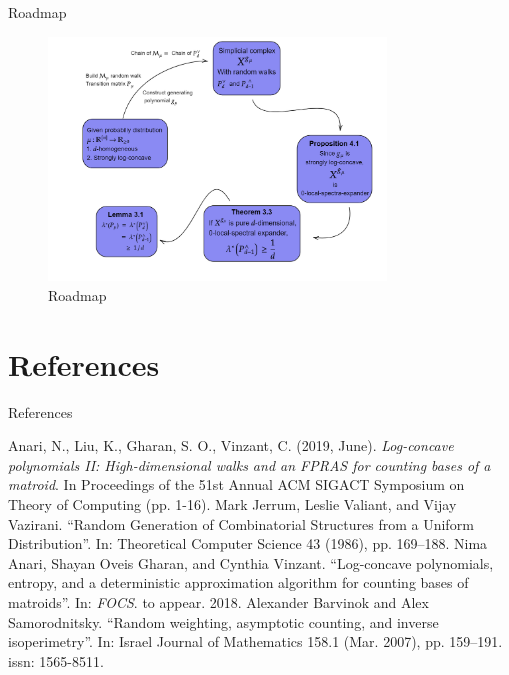 \documentclass[10pt]{beamer}
\begin{document}
\begin{frame}{Roadmap}
    \begin{figure}[H]
        \centering
        \includegraphics[width  = 0.8\textwidth]{imgs/diagram-20231214 (1).png}
        \caption{Roadmap}
        \label{fig:enter-label}
    \end{figure}
\end{frame}


\section[References]{References}
\begin{frame}{References}
\footnotesize\begin{thebibliography}{9}
    Anari, N., Liu, K., Gharan, S. O., Vinzant, C. (2019, June). \emph{Log-concave polynomials II: High-dimensional walks and an FPRAS for counting bases of a matroid}. In Proceedings of the  51st Annual ACM SIGACT Symposium on Theory of Computing (pp. 1-16).
    Mark Jerrum, Leslie Valiant, and Vijay Vazirani. “Random Generation of Combinatorial Structures from a Uniform Distribution”. In: Theoretical Computer Science 43 (1986), pp. 169–188.
    Nima Anari, Shayan Oveis Gharan, and Cynthia Vinzant. “Log-concave polynomials, entropy, and a deterministic approximation algorithm for counting bases of matroids”. In: \textit{FOCS}. to appear. 2018.
    Alexander Barvinok and Alex Samorodnitsky. “Random weighting, asymptotic counting, and inverse isoperimetry”. In: Israel Journal of Mathematics 158.1 (Mar. 2007), pp. 159–191. issn: 1565-8511.
\end{thebibliography}
\end{frame}
\end{document}
